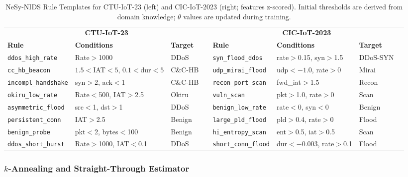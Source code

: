 \documentclass[conference]{IEEEtran}
\begin{document}
\begin{table}[!t]
\renewcommand{\arraystretch}{1.1}
\caption{NeSy-NIDS Rule Templates for CTU-IoT-23 (left) and CIC-IoT-2023
  (right; features z-scored). Initial thresholds are derived from domain
  knowledge; $\theta$ values are updated during training.}
\label{tab:rules}
\centering
\footnotesize
\begin{tabular}{llll@{\hspace{1.5em}}llll}
\toprule
\multicolumn{4}{c}{\textbf{CTU-IoT-23}} &
\multicolumn{4}{c}{\textbf{CIC-IoT-2023}} \\
\cmidrule(r){1-4}\cmidrule(l){5-8}
\textbf{Rule} & \textbf{Conditions} & \textbf{Target} & &
\textbf{Rule} & \textbf{Conditions} & \textbf{Target} & \\
\midrule
\texttt{ddos\_high\_rate}    & Rate$>$1000            & DDoS    &&
\texttt{syn\_flood\_ddos}    & rate$>$0.15, syn$>$1.5 & DDoS-SYN \\
\texttt{cc\_hb\_beacon}      & $1.5{<}$IAT$<5$, $0.1{<}$dur$<5$ & C\&C-HB &&
\texttt{udp\_mirai\_flood}   & udp$<{-}1.0$, rate$>$0 & Mirai \\
\texttt{incompl\_handshake}  & syn$>$2, ack$<$1       & C\&C-HB &&
\texttt{recon\_port\_scan}   & fwd\_iat$>$1.5         & Recon \\
\texttt{okiru\_low\_rate}    & Rate$<$500, IAT$>$2.5  & Okiru   &&
\texttt{vuln\_scan}          & pkt$>$1.0, rate$>$0    & Scan \\
\texttt{asymmetric\_flood}   & src$<$1, dst$>$1       & DDoS    &&
\texttt{benign\_low\_rate}   & rate$<$0, syn$<$0      & Benign \\
\texttt{persistent\_conn}    & IAT$>$2.5              & Benign  &&
\texttt{large\_pld\_flood}   & pld$>$0.4, rate$>$0    & Flood \\
\texttt{benign\_probe}       & pkt$<$2, bytes$<$100   & Benign  &&
\texttt{hi\_entropy\_scan}   & ent$>$0.5, iat$>$0.5   & Scan \\
\texttt{ddos\_short\_burst}  & Rate$>$1000, IAT$<$0.1 & DDoS    &&
\texttt{short\_conn\_flood}  & dur$<{-}0.003$, rate$>$0.1 & Flood \\
\bottomrule
\end{tabular}
\end{table}

\subsubsection{\texorpdfstring{$k$}{k}-Annealing and Straight-Through Estimator}
\end{document}
